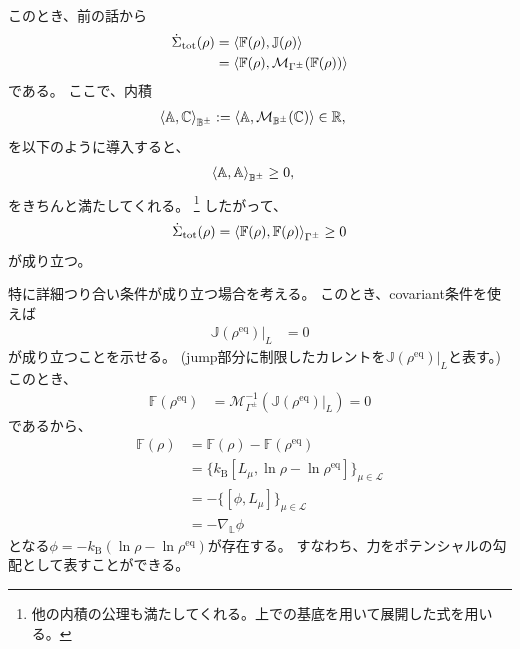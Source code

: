 \documentclass[a4paper,11pt]{jsarticle}
\numberwithin{equation}{section}
\begin{document}
このとき、前の話から
\begin{align}
\dot{\Sigma}_{\mathrm{tot}}(\rho)
&= \ev{\mathbb{F}(\rho), \mathbb{J}(\rho)}\\
&= \ev{\mathbb{F}(\rho), \mathcal{M}_{\Gamma^{\pm}}(\mathbb{F}(\rho))}\\
\end{align}
である。
ここで、内積
\begin{align}
\ev{\mathbb{A}, \mathbb{C}}_{\mathbb{B}^{\pm}}
&:= \ev{\mathbb{A}, \mathcal{M}_{\mathbb{B^{\pm}}}(\mathbb{C})} \in \mathbb{R},
\end{align}
を以下のように導入すると、
\begin{align}
\ev{\mathbb{A}, \mathbb{A}}_{\mathbb{B}^{\pm}} &\ge 0,
\end{align}
をきちんと満たしてくれる。
\footnote{他の内積の公理も満たしてくれる。上での基底を用いて展開した式を用いる。}
したがって、
\begin{align}
\dot{\Sigma}_{\mathrm{tot}}(\rho)
= \ev{\mathbb{F}(\rho), \mathbb{F}(\rho)}_{\Gamma^{\pm}}
\ge 0
\end{align}
が成り立つ。

特に詳細つり合い条件が成り立つ場合を考える。
このとき、covariant条件を使えば
\begin{align}
    \mathbb{J}(\rho^{\mathrm{eq}})|_{L} &= 0
\end{align}
が成り立つことを示せる。
(jump部分に制限したカレントを$\mathbb{J}(\rho^{\mathrm{eq}})|_{L}$と表す。)
このとき、
\begin{align}
    \mathbb{F}(\rho^{\mathrm{eq}}) &= \mathcal{M}_{\Gamma^{\pm}}^{-1}(\mathbb{J}(\rho^{\mathrm{eq}})|_{L}) = 0
\end{align}
であるから、
\begin{align}
    \mathbb{F}(\rho) &= \mathbb{F}(\rho) - \mathbb{F}(\rho^{\mathrm{eq}})\\
    &= \{k_{\mathrm{B}} [L_{\mu}, \ln \rho - \ln \rho^{\mathrm{eq}}]\}_{\mu \in \mathcal{L}} \\
    &= -\{[\phi, L_{\mu}]\}_{\mu \in \mathcal{L}} \\
    &= - \nabla_{\mathbb{L}} \phi
\end{align}
となる$\phi = -k_{\mathrm{B}} (\ln \rho - \ln \rho^{\mathrm{eq}})$が存在する。
すなわち、力をポテンシャルの勾配として表すことができる。
\end{document}
